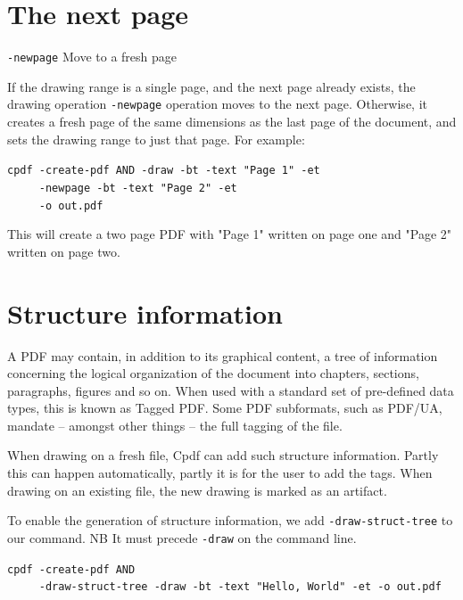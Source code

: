 \documentclass{book}
\begin{document}
\section{The next page}

  {\small\begin{framed}
   \vspace{1.5mm}
   \noindent\verb!-newpage! Move to a fresh page
  \end{framed}}

If the drawing range is a single page, and the next page already exists, the drawing operation \texttt{-newpage} operation moves to the next page. Otherwise, it creates a fresh page of the same dimensions as the last page of the document, and sets the drawing range to just that page. For example:

\begin{framed}
 \noindent\small\verb?cpdf -create-pdf AND -draw -bt -text "Page 1" -et?\\
 \noindent\small\verb?     -newpage -bt -text "Page 2" -et?\\
 \noindent\small\verb?     -o out.pdf?
\end{framed}

\noindent This will create a two page PDF with "Page 1" written on page one and "Page 2" written on page two.

\section{Structure information}

A PDF may contain, in addition to its graphical content, a tree of information concerning the logical organization of the document into chapters, sections, paragraphs, figures and so on. When used with a standard set of pre-defined data types, this is known as Tagged PDF. Some PDF subformats, such as PDF/UA, mandate -- amongst other things -- the full tagging of the file.

When drawing on a fresh file, Cpdf can add such structure information. Partly this can happen automatically, partly it is for the user to add the tags. When drawing on an existing file, the new drawing is marked as an artifact.

To enable the generation of structure information, we add \texttt{-draw-struct-tree} to our command. NB It must precede \texttt{-draw} on the command line.

\begin{framed}
   \noindent\small\verb!cpdf -create-pdf AND!\\
   \noindent\small\verb!     -draw-struct-tree -draw -bt -text "Hello, World" -et -o out.pdf!
\end{framed}
\end{document}
